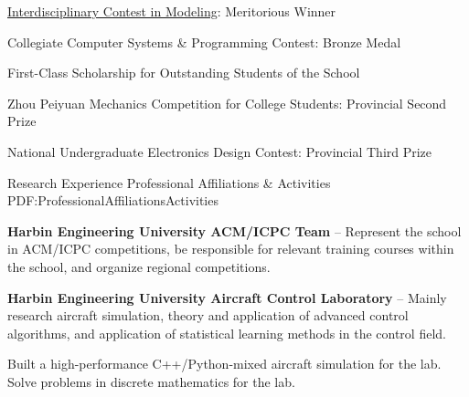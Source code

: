 \documentclass[letterpaper,MMMyyyy,nonstopmode]{simpleresumecv}
\begin{document}
\begin{Body}
\Gap
\BulletItem
\href{www.comap.com}{Interdisciplinary Contest in Modeling}: Meritorious Winner
\hfill
{}

\Gap
\BulletItem
Collegiate Computer Systems \& Programming Contest: Bronze Medal
\hfill
{}

\Gap
\BulletItem
First-Class Scholarship for Outstanding Students of the School
\hfill
{}

\Gap
\BulletItem
Zhou Peiyuan Mechanics Competition for College Students: Provincial Second Prize
\hfill

\Gap
\BulletItem
National Undergraduate Electronics Design Contest: Provincial Third Prize
\hfill

\Section
{Research\newline
Experience}
{Professional Affiliations \& Activities}
{PDF:ProfessionalAffiliationsActivities}

\Entry
\textbf{Harbin Engineering University ACM/ICPC Team}
\hfill
{} --
\newline
Represent the school in ACM/ICPC competitions, be responsible for relevant training courses within the school, and organize regional competitions.

\BigGap
\textbf{Harbin Engineering University Aircraft Control Laboratory}
\hfill
{} --
\newline
Mainly research aircraft simulation, theory and application of advanced control algorithms, and application of statistical learning methods in the control field.
\begin{Detail}
\BulletItem
Built a high-performance C++/Python-mixed aircraft simulation for the lab.
\BulletItem
Solve problems in discrete mathematics for the lab.
\end{Detail}


\end{Body}
\end{document}
